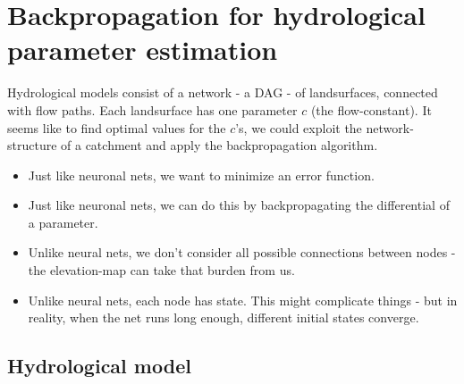 \section{Backpropagation for hydrological parameter estimation}

Hydrological models consist of a network - a DAG - of landsurfaces, connected with flow paths. Each landsurface has one parameter $c$ (the flow-constant). 
It seems like to find optimal values for the $c$'s, we could exploit the network-structure of a catchment and apply the backpropagation algorithm.

\begin{itemize}
	\item Just like neuronal nets, we want to minimize an error function.
	\item Just like neuronal nets, we can do this by backpropagating the differential of a parameter. 
	\item Unlike neural nets, we don't consider all possible connections between nodes - the elevation-map can take that burden from us.
	\item Unlike neural nets, each node has state. This might complicate things - but in reality, when the net runs long enough, different initial states converge.
\end{itemize}


\subsection{Hydrological model}


